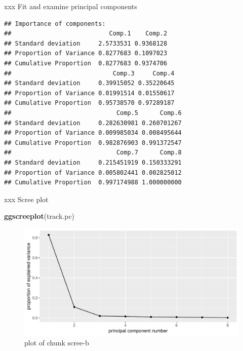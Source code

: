 \documentclass[ignorenonframetext,]{beamer}
\newenvironment{Shaded}{\begin{snugshade}}{\end{snugshade}}
\newcommand{\DataTypeTok}[1]{\textcolor[rgb]{0.13,0.29,0.53}{#1}}
\newcommand{\KeywordTok}[1]{\textcolor[rgb]{0.13,0.29,0.53}{\textbf{#1}}}
\newcommand{\NormalTok}[1]{#1}
\newcommand{\OperatorTok}[1]{\textcolor[rgb]{0.81,0.36,0.00}{\textbf{#1}}}
\newcommand{\StringTok}[1]{\textcolor[rgb]{0.31,0.60,0.02}{#1}}
\begin{document}
\begin{frame}[fragile]{xxx Fit and examine principal components}
\protect\hypertarget{xxx-fit-and-examine-principal-components}{}

\begin{Shaded}
\end{Shaded}

\begin{verbatim}
## Importance of components:
##                           Comp.1    Comp.2
## Standard deviation     2.5733531 0.9368128
## Proportion of Variance 0.8277683 0.1097023
## Cumulative Proportion  0.8277683 0.9374706
##                            Comp.3     Comp.4
## Standard deviation     0.39915052 0.35220645
## Proportion of Variance 0.01991514 0.01550617
## Cumulative Proportion  0.95738570 0.97289187
##                             Comp.5      Comp.6
## Standard deviation     0.282630981 0.260701267
## Proportion of Variance 0.009985034 0.008495644
## Cumulative Proportion  0.982876903 0.991372547
##                             Comp.7      Comp.8
## Standard deviation     0.215451919 0.150333291
## Proportion of Variance 0.005802441 0.002825012
## Cumulative Proportion  0.997174988 1.000000000
\end{verbatim}

\end{frame}

\begin{frame}[fragile]{xxx Scree plot}
\protect\hypertarget{xxx-scree-plot}{}

\begin{Shaded}
\begin{Highlighting}[]
\KeywordTok{ggscreeplot}\NormalTok{(track.pc)}
\end{Highlighting}
\end{Shaded}

\begin{figure}
\centering
\includegraphics{figure/scree-b-1.pdf}
\caption{plot of chunk scree-b}
\end{figure}

\end{frame}
\end{document}
